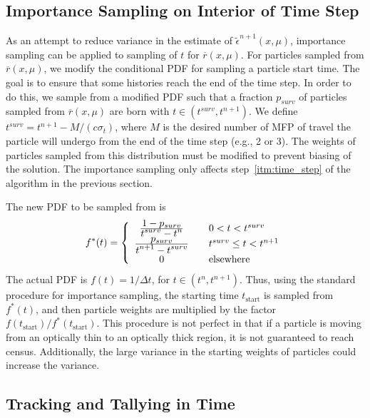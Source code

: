 \subsection{Importance Sampling on Interior of Time Step}
\label{sec:imp_sampling}

As an attempt to reduce variance in the estimate of $\tilde \epsilon^{n+1}(x,\mu)$,
importance sampling can be applied to sampling of $t$ for $\overline r(x,\mu)$.  For
particles sampled from $\overline r(x,\mu)$, we modify the conditional PDF for sampling a
particle start time.  The goal is to ensure that some
histories reach the end of the time step.  In order to do this, we sample from a modified
PDF such that a fraction $p_{surv}$ of particles sampled from $\overline r(x,\mu)$ are born
with $t\in(t^{surv},t^{n+1})$.  We define $t^{surv}=t^{n+1}-M/(c\sigma_t)$, where $M$ is the desired
number of MFP of travel the particle will undergo from the end of
the time step (e.g., 2 or 3).  The weights of particles sampled from this
distribution must be modified to prevent biasing of the solution.  The importance sampling
only affects step~\ref{itm:time_step} of the algorithm in the previous section.

The new PDF to be sampled from is
\begin{equation}
    f^*(t) = \left\{ \begin{array}{cl}
        \frac{\displaystyle 1 - p_{surv}}{\displaystyle t^{surv} - t^n} &\quad 0 < t < t^{surv} \\ 
        \frac{\displaystyle p_{surv}}{\displaystyle t^{n+1} - t^{surv}} & \quad t^{surv} \leq t < t^{n+1}  \\
        0 & \quad \text{elsewhere}\end{array}  \right.
\end{equation}
The actual PDF is $f(t)= 1/\Delta t$, for $t\in(t^{n},t^{n+1})$.  Thus, using the
standard procedure for importance sampling\cite{shultis_mc}, the starting time $t_{\text{start}}$ is sampled from
$f^*(t)$, and then particle weights are multiplied by the factor
$f(t_{\text{start}})/f^*(t_{\text{start}})$.  This procedure is not perfect in that if a
particle is moving from an optically thin to an optically thick
region, it is not guaranteed to reach census. Additionally, the large variance in the
starting weights of particles could increase the variance.  

\subsection{Tracking and Tallying in Time}

